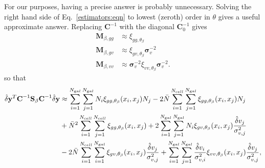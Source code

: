 \documentclass{article}
\begin{document}
For our purposes, having a precise answer is probably unnecessary.
Solving the right hand side of Eq.~\ref{estimators:eqn} to lowest (zeroth) order in $\theta$ gives a useful approximate answer.  Replacing
$\textbf{C}^{-1}$ with the diagonal $\textbf{C}_0^{-1}$ gives
\begin{align*}
\textbf{M}_{\beta,gg} & \approx \xi_{gg,\theta_\beta}\\
\textbf{M}_{\beta,gv} & \approx \xi_{gv,\theta_\beta} \bm{\sigma}^{-2}_v\\
\textbf{M}_{\beta,vv} & \approx \bm{\sigma}^{-2}_v \xi_{vv,\theta_\beta} \bm{\sigma}^{-2}_v .
\end{align*}
so that
\begin{align*}
\hat{\delta} \textbf{y}^T \textbf{C}^{-1} \textbf{S}_\beta \textbf{C}^{-1} \hat{\delta} \textbf{y}  
&\approx \sum_{i=1}^{N_{\text gal}}  \sum_{j=1}^{N_{\text gal}} N_i \xi_{gg,\theta_\beta}(x_i,x_j) N_j 
 - 2\bar{N}   \sum_{i=1}^{N_{\text cell}} \sum_{j=1}^{N_{\text gal}}  \xi_{gg,\theta_\beta}(x_i,x_j)N_j \\
& +\bar{N}^2 \sum_{i=1}^{N_{\text cell}} \sum_{j=1}^{N_{\text cell}} \xi_{gg,\theta_\beta}(x_i,x_j)
 +   2 \sum_{i=1}^{N_{\text gal}}  \sum_{j=1}^{N_{\text gal}}  N_i  \xi_{gv,\theta_\beta}(x_i,x_j)\frac{\hat{\delta} v_j}{\sigma^2_{v,j}} \\
& -   2 \bar{N}  \sum_{i=1}^{N_{\text cell}} \sum_{i=1}^{N_{\text gal}}   \xi_{gv,\theta_\beta}(x_i,x_j) \frac{\hat{\delta} v_j}{\sigma^2_{v,j}} 
+ \sum_{i=1}^{N_{\text gal}}  \sum_{j=1}^{N_{\text gal}}   \frac{\hat{\delta} v_i}{\sigma^2_{v,i}}  \xi_{vv,\theta_\beta}(x_i,x_j)  \frac{\hat{\delta} v_j}{\sigma^2_{v,j}},\\
\end{align*}
\end{document}
